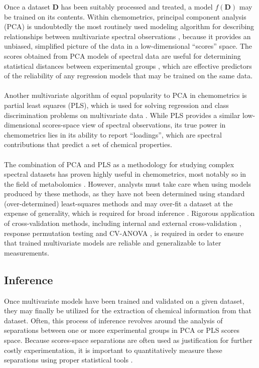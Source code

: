 \begin{doublespace}
Once a dataset $\mathbf{D}$ has been suitably processed and treated, a model
$f(\mathbf{D})$ may be trained on its contents. Within chemometrics, principal
component analysis (PCA) is undoubtedly the most routinely used modeling
algorithm for describing relationships between multivariate spectral
observations \cite{bro:anmeth2014}, because it provides an unbiased,
simplified picture of the data in a low-dimensional ``scores'' space. The
scores obtained from PCA models of spectral data are useful for determining
statistical distances between experimental groups
\cite{demaesschalck:cils2000,worley:abio2013}, which are effective predictors
of the reliability of any regression models that may be trained on the same
data.
\\\\
Another multivariate algorithm of equal popularity to PCA in chemometrics is
partial least squares (PLS), which is used for solving regression and class
discrimination problems on multivariate data \cite{wold1993}. While PLS
provides a similar low-dimensional scores-space view of spectral observations,
its true power in chemometrics lies in its ability to report ``loadings'',
which are spectral contributions that predict a set of chemical properties.
\\\\
The combination of PCA and PLS as a methodology for studying complex spectral
datasets has proven highly useful in chemometrics, most notably so in the
field of metabolomics \cite{lindon:cmr2000}. However, analysts must take care
when using models produced by these methods, as they have not been determined
using standard (over-determined) least-squares methods and may over-fit a
dataset at the expense of generality, which is required for broad inference
\cite{westerhuis:metab2008a}. Rigorous application of cross-validation methods,
including internal and external cross-validation
\cite{xu:cils2001,eshghi:cils2014}, response permutation testing
\cite{golland:learn2005} and CV-ANOVA \cite{eriksson:jchemo2008}, is required
in order to ensure that trained multivariate models are reliable and
generalizable to later measurements.
\end{doublespace}

\subsection{Inference}

\begin{doublespace}
Once multivariate models have been trained and validated on a given dataset,
they may finally be utilized for the extraction of chemical information from
that dataset. Often, this process of inference revolves around the analysis of
separations between one or more experimental groups in PCA or PLS scores space.
Because scores-space separations are often used as justification for further
costly experimentation, it is important to quantitatively measure these
separations using proper statistical tools \cite{worley:abio2013}.
\end{doublespace}

